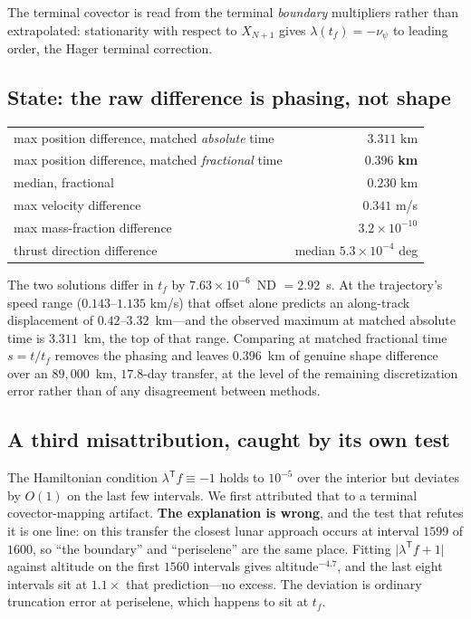 \documentclass[11pt]{article}
\begin{document}
The terminal covector is read from the terminal \emph{boundary} multipliers
rather than extrapolated: stationarity with respect to $X_{N+1}$ gives
$\lambda(t_f) = -\nu_\psi$ to leading order, the Hager terminal correction.

\subsection{State: the raw difference is phasing, not shape}

\begin{table}[h]
\centering\small
\begin{tabular}{lr}
\toprule
max position difference, matched \emph{absolute} time & $3.311$ km \\
max position difference, matched \emph{fractional} time & $\mathbf{0.396}$ \textbf{km} \\
median, fractional & $0.230$ km \\
max velocity difference & $0.341$ m/s \\
max mass-fraction difference & $3.2\times10^{-10}$ \\
thrust direction difference & median $5.3\times10^{-4}$ deg \\
\bottomrule
\end{tabular}
\end{table}

The two solutions differ in $t_f$ by $7.63\times10^{-6}$~ND $= 2.92$~s. At the
trajectory's speed range ($0.143$--$1.135$ km/s) that offset alone predicts an
along-track displacement of $0.42$--$3.32$~km---and the observed maximum at
matched absolute time is $3.311$~km, the top of that range. Comparing at matched
fractional time $s = t/t_f$ removes the phasing and leaves $0.396$~km of genuine
shape difference over an $89{,}000$~km, $17.8$-day transfer, at the level of the
remaining discretization error rather than of any disagreement between methods.

\subsection{A third misattribution, caught by its own test}

The Hamiltonian condition $\lambda^{\mathsf T}f \equiv -1$ holds to
$10^{-5}$ over the interior but deviates by $O(1)$ on the last few intervals. We
first attributed that to a terminal covector-mapping artifact. \textbf{The
explanation is wrong}, and the test that refutes it is one line: on this
transfer the closest lunar approach occurs at interval $1599$ of $1600$, so
``the boundary'' and ``periselene'' are the same place. Fitting
$\lvert\lambda^{\mathsf T}f+1\rvert$ against altitude on the first $1560$
intervals gives altitude$^{-4.7}$, and the last eight intervals sit at
$1.1\times$ that prediction---no excess. The deviation is ordinary truncation
error at periselene, which happens to sit at $t_f$.
\end{document}
